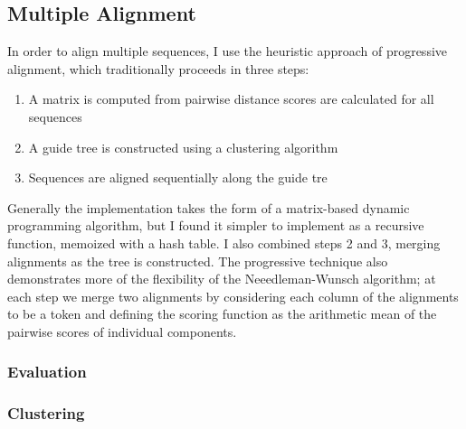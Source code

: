 \documentclass[doc,natbib]{apa6}
\begin{document}

\subsection{Multiple Alignment}

In order to align multiple sequences, I use the heuristic approach of progressive alignment, which traditionally proceeds in three steps: \begin{enumerate}
	\item A matrix is computed from pairwise distance scores are calculated for all sequences
	\item A guide tree is constructed using a clustering algorithm 
	\item Sequences are aligned sequentially along the guide tre
\end{enumerate}

Generally the implementation takes the form of a matrix-based dynamic programming algorithm, but I found it simpler to implement as a recursive function, memoized with a hash table. I also combined steps 2 and 3, merging alignments as the tree is constructed. The progressive technique also demonstrates more of the flexibility of the Neeedleman-Wunsch algorithm; at each step we merge two alignments by considering each column of the alignments to be a token and defining the scoring function as the arithmetic mean of the pairwise scores of individual components. 

\subsubsection{Evaluation}

\begin{table}[h]
\end{table}

\subsubsection{Clustering}
\end{document}
